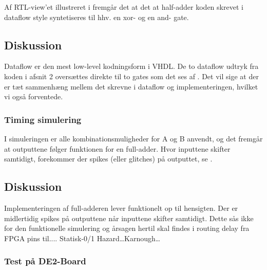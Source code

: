 \documentclass[12pt,a4paper]{article}
\begin{document}
Af RTL-view’et illustreret i  fremgår det at det at
half-adder koden skrevet i dataflow style syntetiseres til hhv.  en xor- og
en and- gate.

\subsection{Diskussion}

Dataflow er den mest low-level kodningsform i VHDL.  De to dataflow udtryk
fra koden i afsnit 2 oversættes direkte til to gates som det ses af
.  Det vil sige at der er tæt sammenhæng mellem det
skrevne i dataflow og implementeringen, hvilket vi også forventede.

\subsubsection{Timing simulering}

% 

I simuleringen er alle kombinationsmuligheder for A og B anvendt, og det
fremgår at outputtene følger funktionen for en full-adder.  Hvor inputtene
skifter samtidigt, forekommer der spikes (eller glitches) på outputtet, se
.

\subsection{Diskussion}

Implementeringen af full-adderen lever funktionelt op til hensigten.  Der er
midlertidig spikes på outputtene når inputtene skifter samtidigt.  Dette sås
ikke for den funktionelle simulering og årsagen hertil skal findes i routing
delay fra FPGA pins til.... Statisk-0/1 Hazard…Karnough…

\subsubsection{Test på DE2-Board}

\end{document}
